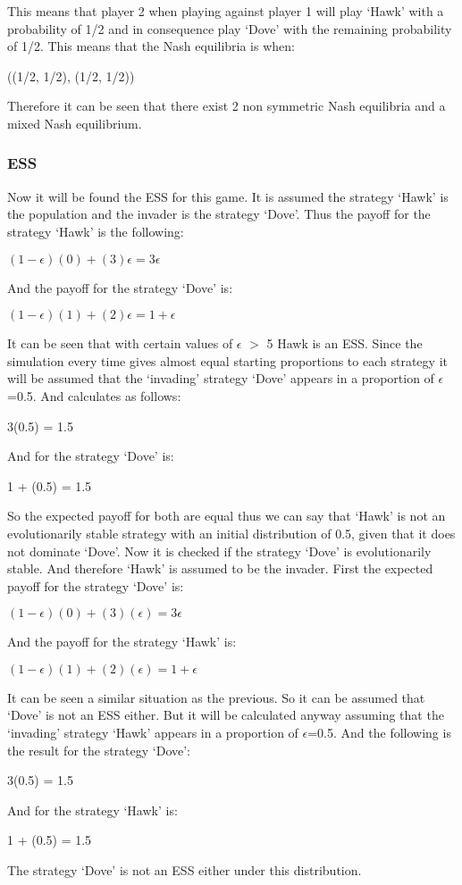 This means that player 2 when playing against player 1 will play `Hawk' with a probability of  1/2  and in consequence play `Dove' with the remaining probability of 1/2. 
This means that the Nash equilibria is when:
\begin{center}
((1/2, 1/2), (1/2, 1/2))
\end{center}
Therefore it can be seen that there exist 2 non symmetric Nash equilibria and a mixed Nash equilibrium.

\subsubsection{ESS}
Now it will be found the ESS for this game. It is assumed the strategy  `Hawk' is the population and the invader is the strategy `Dove'. Thus the payoff for the strategy `Hawk' is the following:
\begin{center}
$(1-{\epsilon})(0) + (3){\epsilon} = 3{\epsilon}$
\end{center}
And the payoff for the strategy `Dove' is:
\begin{center}
$(1-{\epsilon})(1) + (2){\epsilon} = 1 + {\epsilon}$
\end{center}
It can be seen that with certain values of $\epsilon$ $>$ 5 Hawk is an ESS. Since the simulation every time gives almost equal starting proportions to each strategy it will  be assumed that the `invading' strategy `Dove' appears in a proportion of $\epsilon$=0.5. And calculates as follows:
\begin{center}
3(0.5) = 1.5
\end{center}
And for the strategy `Dove' is:
\begin{center}
 1 + (0.5) = 1.5
\end{center}
So the expected payoff for both are equal thus we can say that `Hawk' is not an evolutionarily stable strategy with an initial distribution of 0.5, given that it does not dominate `Dove'.
Now it is checked if the strategy `Dove' is evolutionarily stable. And therefore `Hawk' is assumed to be the invader. First the expected payoff for the strategy `Dove' is:
\begin{center}
$(1-{\epsilon})(0) + (3)({\epsilon}) = 3{\epsilon} $
\end{center}
And the payoff for the strategy `Hawk' is:
\begin{center}
$(1-{\epsilon})(1) + (2)({\epsilon}) =  1 + {\epsilon}$
\end{center}
It can be seen a similar situation as the previous. So it can be assumed that `Dove' is not an ESS either. But it will be calculated anyway assuming that the `invading' strategy `Hawk' appears in a proportion of $\epsilon$=0.5. And the following is the result for the strategy `Dove':
\begin{center}
3(0.5) = 1.5
\end{center}
And for the strategy `Hawk' is:
\begin{center}
 1 + (0.5) = 1.5
\end{center}
The strategy `Dove' is not an ESS either under this distribution.

